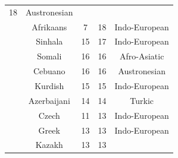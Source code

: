 \begin{center}
{\begin{tabular}{|c|c|c|c|c|}
18 &
	

Austronesian \\
	\thetablecount\stepcounter{tablecount} &

Afrikaans &
	

7 &
	

18 &
	

Indo-European \\
	\thetablecount\stepcounter{tablecount} &

Sinhala &
	

15 &
	

17 &
	

Indo-European \\
	\thetablecount\stepcounter{tablecount} &

Somali &
	

16 &
	

16 &
	

Afro-Asiatic \\

	\thetablecount\stepcounter{tablecount} &
Cebuano &
	

16 &
	

16 &
	

Austronesian \\
	\thetablecount\stepcounter{tablecount} &

Kurdish &
	

15 &
	

15 &
	

Indo-European \\

	\thetablecount\stepcounter{tablecount} &
Azerbaijani &
	

14 &
	

14 &
	

Turkic \\

	\thetablecount\stepcounter{tablecount} &
Czech &
	

11 &
	

13 &
	

Indo-European \\
	\thetablecount\stepcounter{tablecount} &

Greek &
	

13 &
	

13 &
	

Indo-European \\
	\thetablecount\stepcounter{tablecount} &

Kazakh &
	

13 &
	

13 &
	


\end{tabular}}
\end{center}
